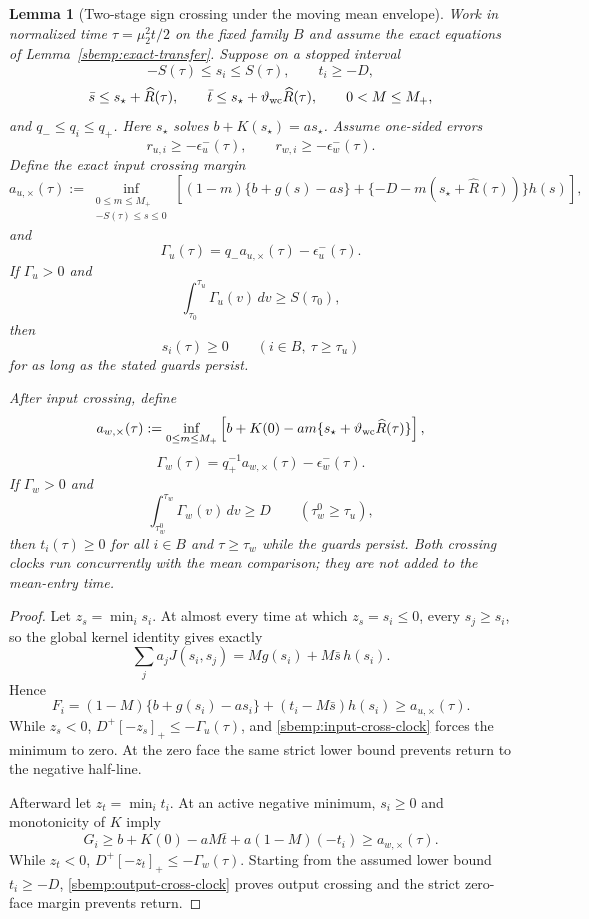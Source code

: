 \documentclass{article} %
\theoremstyle{plain}
\newtheorem{lemma}[theorem]{Lemma}
\theoremstyle{definition}
\theoremstyle{remark}
\begin{document}
\begin{lemma}[Two-stage sign crossing under the moving mean envelope]
\label{sbemp:sign-crossing}
Work in normalized time $\tau=\mu_2^2t/2$ on the fixed family $B$ and
assume the exact equations of Lemma~\ref{sbemp:exact-transfer}.  Suppose on
a stopped interval
\[
 -S(\tau)\le s_i\le S(\tau),\qquad t_i\ge-D,
\]
\[
 \bar s\le s_\star+\widehat R(\tau),\qquad
 \bar t\le s_\star+\vartheta_{\rm wc}\widehat R(\tau),
 \qquad 0<M\le M_+,
\]
and $q_-\le q_i\le q_+$.  Here $s_\star$ solves
$b+K(s_\star)=as_\star$.  Assume one-sided errors
\[
 r_{u,i}\ge-\epsilon_u^-(\tau),\qquad
 r_{w,i}\ge-\epsilon_w^-(\tau).
\]
Define the exact input crossing margin
\begin{equation}\label{sbemp:input-cross-margin}
 a_{u,\times}(\tau)
 :=\inf_{\substack{0\le m\le M_+\\-S(\tau)\le s\le0}}
 \left[(1-m)\{b+g(s)-as\}
 +\{-D-m(s_\star+\widehat R(\tau))\}h(s)\right],
\end{equation}
and
\[
 \Gamma_u(\tau)=q_-a_{u,\times}(\tau)-\epsilon_u^-(\tau).
\]
If $\Gamma_u>0$ and
\begin{equation}\label{sbemp:input-cross-clock}
 \int_{\tau_0}^{\tau_u}\Gamma_u(v)\,dv\ge S(\tau_0),
\end{equation}
then
\[
 s_i(\tau)\ge0\qquad(i\in B,\ \tau\ge\tau_u)
\]
for as long as the stated guards persist.

After input crossing, define
\begin{equation}\label{sbemp:output-cross-margin}
 a_{w,\times}(\tau)
 :=\inf_{0\le m\le M_+}
 \left[b+K(0)-am\{s_\star+
 \vartheta_{\rm wc}\widehat R(\tau)\}\right],
\end{equation}
\[
 \Gamma_w(\tau)=q_+^{-1}a_{w,\times}(\tau)-\epsilon_w^-(\tau).
\]
If $\Gamma_w>0$ and
\begin{equation}\label{sbemp:output-cross-clock}
 \int_{\tau_w^0}^{\tau_w}\Gamma_w(v)\,dv\ge D
 \qquad(\tau_w^0\ge\tau_u),
\end{equation}
then $t_i(\tau)\ge0$ for all $i\in B$ and $\tau\ge\tau_w$ while the
guards persist.  Both crossing clocks run concurrently with the mean
comparison; they are not added to the mean-entry time.
\end{lemma}
\begin{proof}
Let $z_s=\min_i s_i$.  At almost every time at which $z_s=s_i\le0$,
every $s_j\ge s_i$, so the global kernel identity gives exactly
\[
 \sum_j a_jJ(s_i,s_j)=Mg(s_i)+M\bar s\,h(s_i).
\]
Hence
\[
 F_i=(1-M)\{b+g(s_i)-as_i\}+(t_i-M\bar s)h(s_i)
 \ge a_{u,\times}(\tau).
\]
While $z_s<0$, $D^+[-z_s]_+\le-\Gamma_u(\tau)$, and
\eqref{sbemp:input-cross-clock} forces the minimum to zero.  At the zero
face the same strict lower bound prevents return to the negative half-line.

Afterward let $z_t=\min_i t_i$.  At an active negative minimum,
$s_i\ge0$ and monotonicity of $K$ imply
\[
 G_i\ge b+K(0)-aM\bar t+a(1-M)(-t_i)
 \ge a_{w,\times}(\tau).
\]
While $z_t<0$, $D^+[-z_t]_+\le-\Gamma_w(\tau)$.  Starting from the assumed lower
bound $t_i\ge-D$, \eqref{sbemp:output-cross-clock} proves output crossing
and the strict zero-face margin prevents return.
\end{proof}
\end{document}
